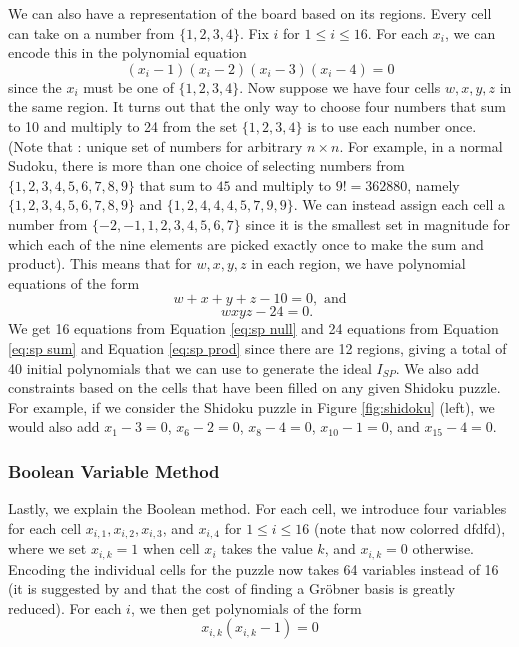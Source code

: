 \documentclass[../main.tex]{subfiles}
\begin{document}
            We can also have a representation of the board based on its regions. Every cell can take on a number from $\{1,2,3,4\}$. Fix $i$ for $1\leq i\leq 16$. For each $x_i$, we can encode this in the polynomial equation
            \begin{equation}
                \label{eq:sp null}
                (x_i-1)(x_i-2)(x_i-3)(x_i-4)=0
            \end{equation}
            since the $x_i$ must be one of $\{1,2,3,4\}$. Now suppose we have four cells $w,x,y,z$ in the same region. It turns out that the only way to choose four numbers that sum to 10 and multiply to 24 from the set $\{1,2,3,4\}$ is to use each number once. (Note that : {\color{red} unique set of numbers for arbitrary $n\times n$.} For example, in a normal Sudoku, there is more than one choice of selecting numbers from $\{1,2,3,4,5,6,7,8,9\}$ that sum to $45$ and multiply to $9!=362880$, namely $\{1,2,3,4,5,6,7,8,9\}$ and $\{1,2,4,4,4,5,7,9,9\}$. We can instead assign each cell a number from $\{-2,-1,1,2,3,4,5,6,7\}$ since it is the smallest set in magnitude for which each of the nine elements are picked exactly once to make the sum and product). This means that for $w,x,y,z$ in each region, we have polynomial equations of the form
            \begin{equation}
                \label{eq:sp sum}
                w+x+y+z-10=0, \text{ and} 
            \end{equation}
            \begin{equation}
                \label{eq:sp prod}
                \quad wxyz -24 = 0.
            \end{equation}
            We get 16 equations from Equation \ref{eq:sp null} and 24 equations from Equation \ref{eq:sp sum} and Equation \ref{eq:sp prod} since there are 12 regions, giving a total of 40 initial polynomials that we can use to generate the ideal $I_{SP}$. We also add constraints based on the cells that have been filled on any given Shidoku puzzle. For example, if we consider the Shidoku puzzle in Figure \ref{fig:shidoku} (left), we would also add $x_1-3=0$, $x_6-2=0$, $x_8-4=0$, $x_{10}-1=0$, and $x_{15}-4=0$.  

            \subsubsection{Boolean Variable Method}

            Lastly, we explain the Boolean method. For each cell, we introduce four variables for each cell $x_{i,1}, x_{i,2}, x_{i,3}$, and $x_{i,4}$ for $1\leq i\leq 16$ (note that now {color{red} dfdfd}), where we set $x_{i,k}=1$ when cell $x_i$ takes the value $k$, and $x_{i,k}=0$ otherwise. Encoding the individual cells for the puzzle now takes 64 variables instead of 16 (it is suggested by \citet{bernasconi1997computing} and \citet{sato2008computation} that the cost of finding a Gr\"obner basis is greatly reduced). For each $i$, we then get polynomials of the form
            \begin{equation} \label{eq:bool}
                x_{i,k}(x_{i,k}-1)=0
            \end{equation}
\end{document}
